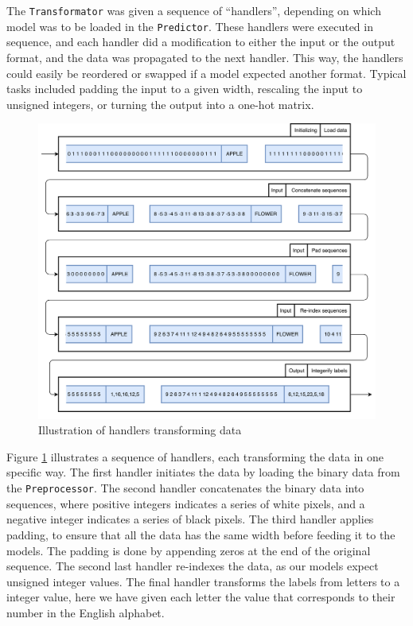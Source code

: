 The {\tt Transformator} was given a sequence of ``handlers'', depending on which model was to be loaded in the {\tt Predictor}. These handlers were executed in sequence, and each handler did a modification to either the input or the output format, and the data was propagated to the next handler. This way, the handlers could easily be reordered or swapped if a model expected another format. Typical tasks included padding the input to a given width, rescaling the input to unsigned integers, or turning the output into a one-hot matrix.

\begin{figure}[ht]
    \centering
    \includegraphics[width=1\textwidth]{fig/development_process/transformator.png}
    \caption{Illustration of handlers transforming data}
    \label{fig:development-transformator}
\end{figure}

Figure \ref{fig:development-transformator} illustrates a sequence of handlers, each transforming the data in one specific way. The first handler initiates the data by loading the binary data from the {\tt Preprocessor}. The second handler concatenates the binary data into sequences, where positive integers indicates a series of white pixels, and a negative integer indicates a series of black pixels. The third handler applies padding, to ensure that all the data has the same width before feeding it to the models. The padding is done by appending zeros at the end of the original sequence. The second last handler re-indexes the data, as our models expect unsigned integer values. The final handler transforms the labels from letters to a integer value, here we have given each letter the value that corresponds to their number in the English alphabet.

